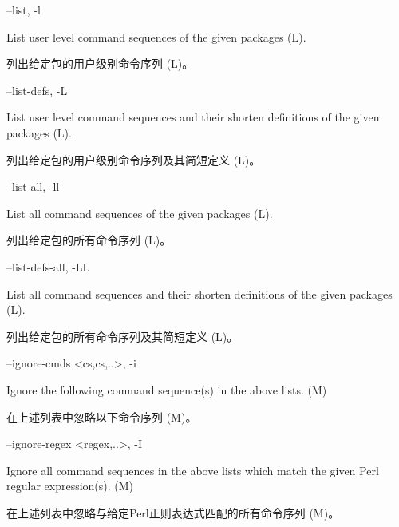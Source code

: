 \documentclass{article}
\newenvironment{options}{%
    \def\cstart{\begingroup\ttfamily\par\noindent\ignorespaces}%
    \def\csep{\endgroup\begingroup\list {}{}\item \relax}%
    \def\cend{\endlist\par\medskip\endgroup\cstart}%
    \cstart
}{%
    \endgroup
}
\begin{document}
\begin{options}
--list, -l                                         \csep 
List user level command sequences of the given packages (L).

列出给定包的用户级别命令序列 (L)。
\cend
\end{options}

\begin{options}
--list-defs, -L                                    \csep 
List user level command sequences and their shorten definitions of the given packages (L).

列出给定包的用户级别命令序列及其简短定义 (L)。
\cend
\end{options}

\begin{options}
--list-all, -ll                                    \csep 
List all command sequences of the given packages (L).

列出给定包的所有命令序列 (L)。
\cend
\end{options}

\begin{options}
--list-defs-all, -LL                               \csep 
List all command sequences and their shorten definitions of the given packages (L).

列出给定包的所有命令序列及其简短定义 (L)。
\cend
\end{options}

\begin{options}
--ignore-cmds \MacroArgs<cs,cs,..>,  -i            \csep 
Ignore the following command sequence(s) in the above lists. (M)

在上述列表中忽略以下命令序列 (M)。
\cend
\end{options}

\begin{options}
--ignore-regex \MacroArgs<regex,..>, -I            \csep 
Ignore all command sequences in the above lists which match the given Perl regular expression(s). (M)

在上述列表中忽略与给定Perl正则表达式匹配的所有命令序列 (M)。
\cend
\end{options}
\end{document}
